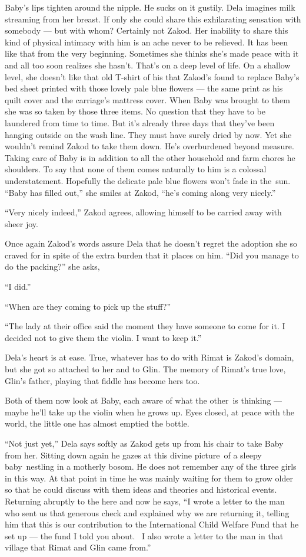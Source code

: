 \documentclass[twoside,11pt]{book}
\begin{document}
Baby's lips tighten around the nipple. He sucks on it gustily. Dela imagines milk streaming from her breast.  If only
she could share this exhilarating sensation with somebody --- but with whom? Certainly not Zakod. Her inability to share
this kind of physical intimacy with him is an ache never to be relieved. It has been like that from the very
beginning. Sometimes she thinks she's made peace with it and all too soon realizes she hasn't. That's on a deep level
of life. On a shallow level, she doesn't like that old T-shirt of his that Zakod's found to replace Baby's bed
sheet printed with those lovely pale blue flowers --- the same print as his quilt cover and the carriage's mattress
cover. When Baby was brought to them she was so taken by those three items. No question that they have to be laundered
from time to time. But it's already three days that they've been hanging outside on the wash line. They must have
surely dried by now. Yet she wouldn't remind Zakod to take them down. He's overburdened beyond measure. Taking care
of Baby is in addition to all the other household and farm chores he shoulders. To say that none of them comes naturally to
him is a colossal understatement. Hopefully the delicate pale blue flowers won't fade in the~sun. ``Baby
has filled out,'' she smiles at Zakod, ``he's coming along very nicely.''

``Very nicely indeed,'' Zakod agrees, allowing himself to be carried away with sheer joy.

Once again Zakod's words assure Dela that he doesn't regret the adoption she so craved for in spite of the extra burden
that it places on him. ``Did you manage to do the packing?'' she asks,

``I did.''

``When are they coming to pick up the stuff?''

``The lady at their office said the moment they have someone to come for it. I decided not to give them the
violin. I want to keep it.''

Dela's heart is at ease. True, whatever has to do with Rimat is Zakod's domain, but she got so attached to her and to
Glin. The memory of Rimat's true love, Glin's father, playing that fiddle has become hers too.

Both of them now look at Baby, each aware of what the other~is thinking --- maybe he'll take up the violin when he grows
up. Eyes closed, at peace with the world, the little one has almost emptied the bottle.

``Not just yet,'' Dela says softly as Zakod gets up from his chair to take Baby from her.
Sitting down again he gazes at this divine picture~of a sleepy baby~nestling in a motherly bosom. He does not remember
any of the three girls in this way. At that point in time he was mainly waiting for them to grow older so that he
could discuss with them ideas and theories and historical events. Returning abruptly to the here and now he says,
``I wrote a letter to the man who sent us that generous check and explained why we are returning it,
telling him that this is our contribution to the International Child Welfare Fund that he set up --- the fund I told you
about. ~I also wrote a letter to the man in that village that Rimat and Glin came from.''
\end{document}
